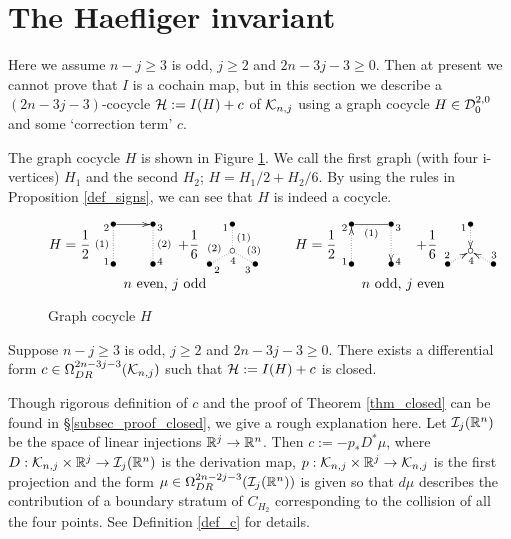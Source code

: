\section{The Haefliger invariant}\label{sec_Haefliger}


Here we assume $n-j \ge 3$ is odd, $j \ge 2$ and $2n-3j-3 \ge 0$.
Then at present we cannot prove that $I$ is a cochain map, but in this section we describe a $(2n-3j-3)$-cocycle
$\mathcal{H} :=I(H)+c$ of $\mathcal{K}_{n ,j}$ using a graph cocycle $H \in \mathcal{D}^{2,0}_0$ and some `correction term' $c$.


The graph cocycle $H$ is shown in Figure \ref{fig_H}.
We call the first graph (with four i-vertices) $H_1$ and the second $H_2$; $H =H_1 /2 +H_2 /6$.
By using the rules in Proposition \ref{def_signs}, we can see that $H$ is indeed a cocycle.
\begin{figure}[htb]%
\[
 \begin{xy}
  (-6,5)*{H=\dfrac{1}{2}},(24,5)*{+\dfrac{1}{6}},
  (5,0)*{\bullet}="A", (5,10)*{\bullet}="B", (15,10)*{\bullet}="C", (15,0)*{\bullet}="D",
  {\ar@{.} "A";"B"^<{1}^(.5){(1)}^>{2}},{\ar "B";"C"},{\ar@{.} "C";"D"^<{3}^(.5){(2)}^>{4}},
  (35,3.33)*{\circ}="E",(35,10)*{\bullet}="F",(29.227,0)*{\bullet}="G",(40.773,0)*{\bullet}="H",
  {\ar@{.} "E";"F"_(.5){(1)}^>{1}},{\ar@{.} "E";"G"^<{4}_(.5){(2)}^>{2}},{\ar@{.} "E";"H"^(.65){(3)}_>{3}},
  (18,-5)*{n \text{ even, } j \text{ odd}},
  (56,5)*{H=\dfrac{1}{2}},(84,5)*{+\dfrac{1}{6}},
  (65,0)*{\bullet}="a", (65,10)*{\bullet}="b", (75,10)*{\bullet}="c", (75,0)*{\bullet}="d",
  {\ar@{.>} "a";"b"^<{1}^>{2}},{\ar@{-} "b";"c"_(.5){(1)}},{\ar@{.>} "c";"d"^<{3}^>{4}},
  (95,3.33)*{\circ}="e",(95,10)*{\bullet}="f",(89.227,0)*{\bullet}="g",(100.773,0)*{\bullet}="h",
  {\ar@{.>} "f";"e"_<{1}},{\ar@{.>} "g";"e"^<{2}_>{4}},{\ar@{.>} "h";"e"_<{3}},
  (78,-5)*{n \text{ odd, } j \text{ even}}
 \end{xy}
\]
\caption{Graph cocycle $H$}\label{fig_H}
\end{figure}


\begin{thm}\label{thm_closed}
Suppose $n-j \ge 3$ is odd, $j \ge 2$ and $2n-3j-3 \ge 0$.
There exists a differential form $c\in \Omega^{2n-3j-3}_{DR}(\mathcal{K}_{n ,j})$ such that $\mathcal{H} := I(H)+c$ is closed.
\end{thm}


Though rigorous definition of $c$ and the proof of Theorem \ref{thm_closed} can be found in \S \ref{subsec_proof_closed},
we give a rough explanation here.
Let $\mathcal{I}_j (\mathbb{R}^n )$ be the space of linear injections $\mathbb{R}^j \to \mathbb{R}^n$.
Then $c:=-p_* D^* \mu$, where $D:\mathcal{K}_{n ,j} \times \mathbb{R}^j \to \mathcal{I}_j (\mathbb{R}^n )$ is the derivation map,
$p:\mathcal{K}_{n ,j}\times \mathbb{R}^j \to \mathcal{K}_{n ,j}$ is the first projection and the form
$\mu \in \Omega^{2n-2j-3}_{DR}(\mathcal{I}_j (\mathbb{R}^n ))$ is given so that $d\mu$ describes the contribution of a boundary stratum
of $C_{H_2}$ corresponding to the collision of all the four points.
See Definition \ref{def_c} for details.


